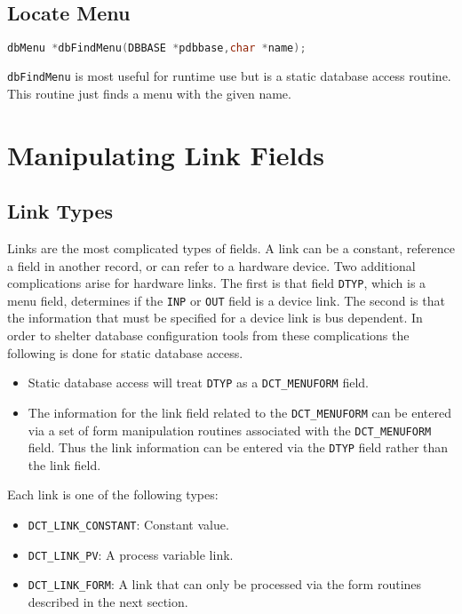 \subsection{Locate Menu}

\begin{lstlisting}[language=C]
dbMenu *dbFindMenu(DBBASE *pdbbase,char *name);
\end{lstlisting}

\verb|dbFindMenu| is most useful for runtime use but is a static database access routine.
This routine just finds a menu with the given name.

\section{Manipulating Link Fields}

\subsection{Link Types}

Links are the most complicated types of fields.
A link can be a constant, reference a field in another record, or can refer to a hardware device.
Two additional complications arise for hardware links.
The first is that field \verb|DTYP|, which is a menu field, determines if the \verb|INP| or \verb|OUT| field is a device link.
The second is that the information that must be specified for a device link is bus dependent.
In order to shelter database configuration tools from these complications the following is done for static database access.

\begin{itemize}
\item Static database access will treat \verb|DTYP| as a \verb|DCT_MENUFORM| field.

\item The information for the link field related to the \verb|DCT_MENUFORM| can be entered via a set of form manipulation routines associated with the \verb|DCT_MENUFORM| field.
Thus the link information can be entered via the \verb|DTYP| field rather than the link field.

\end{itemize}

Each link is one of the following types:

\begin{itemize}
\item {}\verb|DCT_LINK_CONSTANT|: Constant value.

\item {}\verb|DCT_LINK_PV|: A process variable link.

\item {}\verb|DCT_LINK_FORM|: A link that can only be processed via the form routines described in the next section.

\end{itemize}

